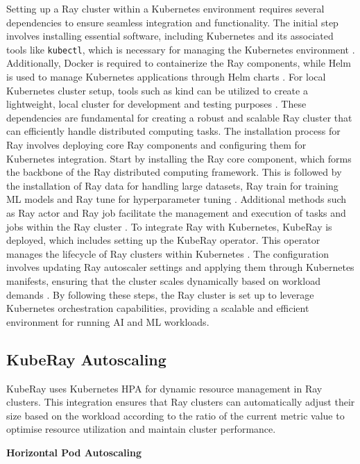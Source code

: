 Setting up a Ray cluster within a Kubernetes environment requires several dependencies to ensure seamless integration and functionality. The initial step involves installing essential software, including Kubernetes and its associated tools like \texttt{kubectl}, which is necessary for managing the Kubernetes environment \cite{Kubernetes_doc}. Additionally, Docker is required to containerize the Ray components, while Helm is used to manage Kubernetes applications through Helm charts \cite{helm_docs}. For local Kubernetes cluster setup, tools such as kind can be utilized to create a lightweight, local cluster for development and testing purposes \cite{kind2021}. These dependencies are fundamental for creating a robust and scalable Ray cluster that can efficiently handle distributed computing tasks. The installation process for Ray involves deploying core Ray components and configuring them for Kubernetes integration. Start by installing the Ray core component, which forms the backbone of the Ray distributed computing framework. This is followed by the installation of Ray data for handling large datasets, Ray train for training ML models and Ray tune for hyperparameter tuning \cite{ray_doc}. Additional methods such as Ray actor and Ray job facilitate the management and execution of tasks and jobs within the Ray cluster \cite{ray_doc}. To integrate Ray with Kubernetes, KubeRay is deployed, which includes setting up the KubeRay operator. This operator manages the lifecycle of Ray clusters within Kubernetes \cite{ray_doc}. The configuration involves updating Ray autoscaler settings and applying them through Kubernetes manifests, ensuring that the cluster scales dynamically based on workload demands \cite{ray_doc}. By following these steps, the Ray cluster is set up to leverage Kubernetes orchestration capabilities, providing a scalable and efficient environment for running AI and ML workloads.

\subsection{KubeRay Autoscaling}

KubeRay uses Kubernetes HPA for dynamic resource management in Ray clusters. This integration ensures that Ray clusters can automatically adjust their size based on the workload according to the ratio of the current metric value to optimise resource utilization and maintain cluster performance. \cite{Kubernetes_doc}

\textbf{Horizontal Pod Autoscaling}

